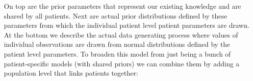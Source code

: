 \documentclass[12pt,a4paper,leqno]{report}
\theoremstyle{plain}
\theoremstyle{definition}
\theoremstyle{remark}
\begin{document}

\bigskip

On top are the prior parameters that represent our existing knowledge and are shared by
all patients. Next are actual prior distributions defined by these parameters from which the individual patient
level patient parameters are drawn. At the bottom we describe the actual data generating
process where values of individual observations are drawn from normal distributions
defined by the patient level parameters. To broaden this model from just being a bunch
of patient-specific models (with shared priors) we can combine
them by adding a population level that links patients together:


\bigskip
\end{document}
